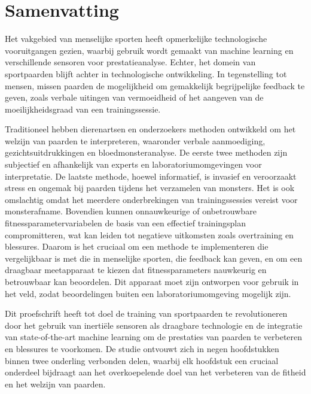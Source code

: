 \chapter*{Samenvatting}

Het vakgebied van menselijke sporten heeft opmerkelijke technologische vooruitgangen gezien, waarbij gebruik wordt gemaakt van machine learning en verschillende sensoren voor prestatieanalyse. Echter, het domein van sportpaarden blijft achter in technologische ontwikkeling. In tegenstelling tot mensen, missen paarden de mogelijkheid om gemakkelijk begrijpelijke feedback te geven, zoals verbale uitingen van vermoeidheid of het aangeven van de moeilijkheidsgraad van een trainingssessie.

Traditioneel hebben dierenartsen en onderzoekers methoden ontwikkeld om het welzijn van paarden te interpreteren, waaronder verbale aanmoediging, gezichtsuitdrukkingen en bloedmonsteranalyse. De eerste twee methoden zijn subjectief en afhankelijk van experts en laboratoriumomgevingen voor interpretatie. De laatste methode, hoewel informatief, is invasief en veroorzaakt stress en ongemak bij paarden tijdens het verzamelen van monsters. Het is ook omslachtig omdat het meerdere onderbrekingen van trainingssessies vereist voor monsterafname. Bovendien kunnen onnauwkeurige of onbetrouwbare fitnessparametervariabelen de basis van een effectief trainingsplan compromitteren, wat kan leiden tot negatieve uitkomsten zoals overtraining en blessures. Daarom is het cruciaal om een methode te implementeren die vergelijkbaar is met die in menselijke sporten, die feedback kan geven, en om een draagbaar meetapparaat te kiezen dat fitnessparameters nauwkeurig en betrouwbaar kan beoordelen. Dit apparaat moet zijn ontworpen voor gebruik in het veld, zodat beoordelingen buiten een laboratoriumomgeving mogelijk zijn.

Dit proefschrift heeft tot doel de training van sportpaarden te revolutioneren door het gebruik van inerti\"{e}le sensoren als draagbare technologie en de integratie van state-of-the-art machine learning om de prestaties van paarden te verbeteren en blessures te voorkomen. De studie ontvouwt zich in negen hoofdstukken binnen twee onderling verbonden delen, waarbij elk hoofdstuk een cruciaal onderdeel bijdraagt aan het overkoepelende doel van het verbeteren van de fitheid en het welzijn van paarden.

